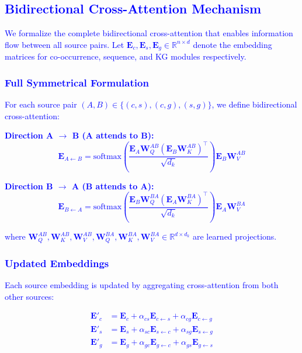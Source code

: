 \documentclass[10pt,twocolumn]{article}
\newcommand{\revision}[1]{\textcolor{blue}{#1}}
\begin{document}
\revision{
\subsection{Bidirectional Cross-Attention Mechanism}
\label{sec:bidirectional}

We formalize the complete bidirectional cross-attention that enables information flow between all source pairs. Let $\mathbf{E}_c, \mathbf{E}_s, \mathbf{E}_g \in \mathbb{R}^{n \times d}$ denote the embedding matrices for co-occurrence, sequence, and KG modules respectively.

\subsubsection{Full Symmetrical Formulation}

For each source pair $(A, B) \in \{(c,s), (c,g), (s,g)\}$, we define bidirectional cross-attention:

\textbf{Direction A $\rightarrow$ B (A attends to B):}
\begin{equation}
\mathbf{E}_{A \leftarrow B} = \text{softmax}\left(\frac{\mathbf{E}_A \mathbf{W}_Q^{AB} (\mathbf{E}_B \mathbf{W}_K^{AB})^\top}{\sqrt{d_k}}\right) \mathbf{E}_B \mathbf{W}_V^{AB}
\end{equation}

\textbf{Direction B $\rightarrow$ A (B attends to A):}
\begin{equation}
\mathbf{E}_{B \leftarrow A} = \text{softmax}\left(\frac{\mathbf{E}_B \mathbf{W}_Q^{BA} (\mathbf{E}_A \mathbf{W}_K^{BA})^\top}{\sqrt{d_k}}\right) \mathbf{E}_A \mathbf{W}_V^{BA}
\end{equation}

where $\mathbf{W}_Q^{AB}, \mathbf{W}_K^{AB}, \mathbf{W}_V^{AB}, \mathbf{W}_Q^{BA}, \mathbf{W}_K^{BA}, \mathbf{W}_V^{BA} \in \mathbb{R}^{d \times d_k}$ are learned projections.

\subsubsection{Updated Embeddings}

Each source embedding is updated by aggregating cross-attention from both other sources:

\begin{align}
\mathbf{E}'_c &= \mathbf{E}_c + \alpha_{cs}\mathbf{E}_{c \leftarrow s} + \alpha_{cg}\mathbf{E}_{c \leftarrow g} \\
\mathbf{E}'_s &= \mathbf{E}_s + \alpha_{sc}\mathbf{E}_{s \leftarrow c} + \alpha_{sg}\mathbf{E}_{s \leftarrow g} \\
\mathbf{E}'_g &= \mathbf{E}_g + \alpha_{gc}\mathbf{E}_{g \leftarrow c} + \alpha_{gs}\mathbf{E}_{g \leftarrow s}
\end{align}

}
\end{document}
